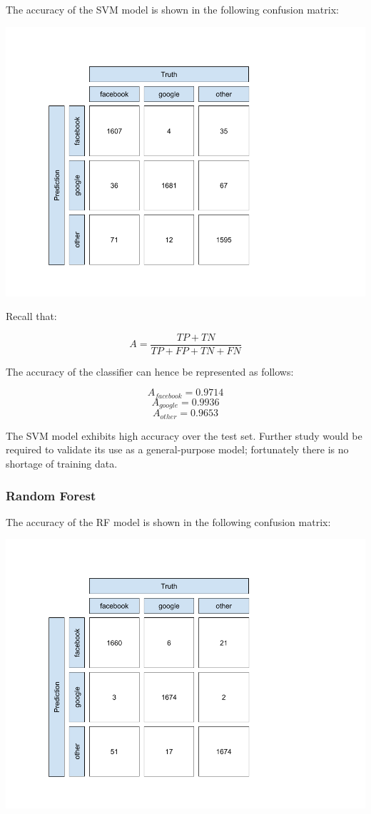 \documentclass[conference]{IEEEtran}
\begin{document}
The accuracy of the SVM model is shown in the following confusion
matrix:

\begin{center}\includegraphics[width=1\linewidth]{SVM} \end{center}

Recall that:

\[A = \frac{TP + TN}{TP + FP + TN + FN}\]

The accuracy of the classifier can hence be represented as follows:

\[A_{facebook} = 0.9714\] \[A_{google} = 0.9936\] \[A_{other} = 0.9653\]

The SVM model exhibits high accuracy over the test set. Further study
would be required to validate its use as a general-purpose model;
fortunately there is no shortage of training data.

\subsubsection{Random Forest}\label{sec:random-forest-2}

The accuracy of the RF model is shown in the following confusion matrix:

\begin{center}\includegraphics[width=1\linewidth]{RF} \end{center}
\end{document}
